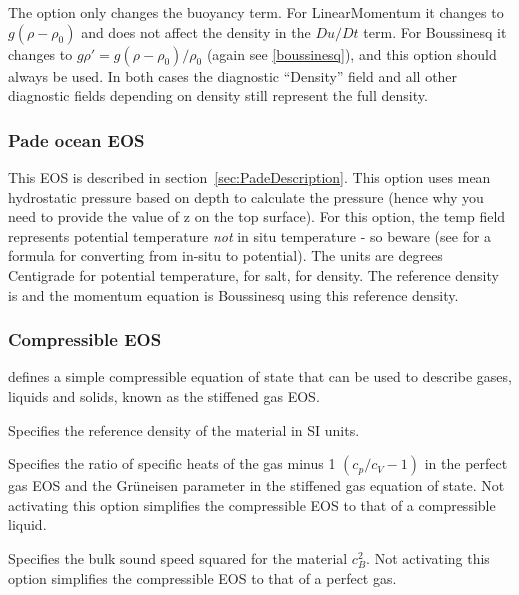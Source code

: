 The option  only changes
the buoyancy term. For LinearMomentum it changes to
$g(\rho-\rho_0)$ and does not affect the density in the $Du/Dt$ term. For
Boussinesq it changes to
$g\rho'=g(\rho-\rho_0)/\rho_0$ (again see \eqref{boussinesq}),
and this option should always be used.
In both cases the diagnostic
``Density'' field and all other diagnostic fields depending on density
still represent the full density.

\subsubsection{Pade ocean EOS}
This EOS is described in section~\ref{sec:PadeDescription}.
This option uses mean hydrostatic pressure based on depth to calculate the
pressure (hence why you need to provide the value of z on the top surface).
For this option, the temp field represents potential temperature \emph{not} in
situ temperature - so beware (see \citet{mcdougall2003} for a formula for converting
from in-situ to potential). The units are degrees Centigrade for potential
temperature, \PSU{} for salt, \kgmm{} for density. The reference density is
\kgmm[1000] and the momentum equation is Boussinesq using this reference density.

\subsubsection{Compressible EOS}\label{sec:Multi-material compressible EOS}
 defines a simple compressible equation of state that can be used to describe gases, liquids and solids, known as the stiffened gas EOS. %

\begin{description}
\item{} Specifies the reference density of the material in SI units.
\item{} Specifies the ratio of
  specific heats of the gas minus 1 $(c_p/c_V-1)$ in the perfect gas EOS and the
  Gr\"uneisen parameter in the stiffened gas equation of state. Not activating this option simplifies the compressible EOS to that of a compressible liquid.
\item{} Specifies the bulk sound speed squared for the material $c_B^2$. Not activating this option simplifies the compressible EOS to that of a perfect gas.
\end{description}

